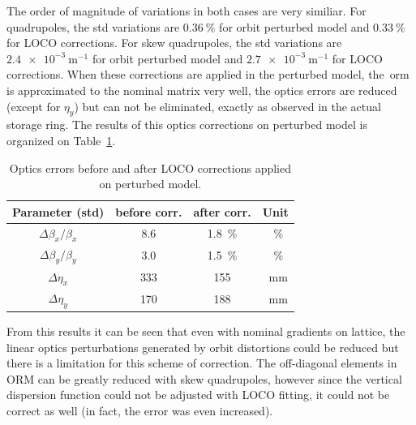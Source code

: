The order of magnitude of variations in both cases are very similiar. For quadrupoles, the std variations are $\SI{0.36}{\%}$ for orbit perturbed model and $\SI{0.33}{\%}$ for LOCO corrections. For skew quadrupoles, the std variations are $\SI{2.4e-3}{\meter^{-1}}$ for orbit perturbed model and $\SI{2.7e-3}{\meter^{-1}}$ for LOCO corrections. When these corrections are applied in the perturbed model, the~\gls{orm} is approximated to the nominal matrix very well, the optics errors are reduced (except for $\eta_y$) but can not be eliminated, exactly as observed in the actual storage ring. The results of this optics corrections on perturbed model is organized on Table~\ref{tab:params_corr}.
\begin{table}[h!]
    \centering
    \caption{Optics errors before and after LOCO corrections applied on perturbed model.}
    \label{tab:params_corr}
    \begin{tabular}{cccc}
        \toprule\toprule
        Parameter (std) & before corr. & after corr. & Unit\\
        \hline
        $\Delta\beta_x/\beta_x$ & \SI{8.6}{} & \SI{1.8}{\%} & \SI{}{\%}\\
        $\Delta\beta_y/\beta_y$ & \SI{3.0}{} & \SI{1.5}{\%} & \SI{}{\%}\\
        $\Delta\eta_x$ & \SI{333}{} & \SI{155}{} & \SI{}{\milli\meter} \\
        $\Delta\eta_y$ & \SI{170}{} & \SI{188}{} & \SI{}{\milli\meter}\\
        \bottomrule\bottomrule
    \end{tabular}
\end{table}


From this results it can be seen that even with nominal gradients on lattice, the linear optics perturbations generated by orbit distortions could be reduced but there is a limitation for this scheme of correction. The off-diagonal elements in ORM can be greatly reduced with skew quadrupoles, however since the vertical dispersion function could not be adjusted with LOCO fitting, it could not be correct as well (in fact, the error was even increased). 

